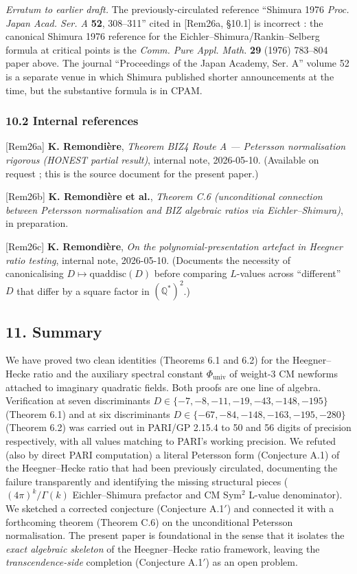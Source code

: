\documentclass[
  11pt,
  a4paper,
]{amsart}
\begin{document}
\emph{Erratum to earlier draft.} The previously-circulated reference ``Shimura 1976 \emph{Proc. Japan Acad. Ser. A} \textbf{52}, 308--311'' cited in {[}Rem26a, §10.1{]} is incorrect : the canonical Shimura 1976 reference for the Eichler--Shimura/Rankin--Selberg formula at critical points is the \emph{Comm. Pure Appl. Math.} \textbf{29} (1976) 783--804 paper above. The journal ``Proceedings of the Japan Academy, Ser. A'' volume 52 is a separate venue in which Shimura published shorter announcements at the time, but the substantive formula is in CPAM.

\hypertarget{internal-references}{%
\subsubsection{10.2 Internal references}\label{internal-references}}

{[}Rem26a{]} \textbf{K. Remondière}, \emph{Theorem BIZ4 Route A --- Petersson normalisation rigorous (HONEST partial result)}, internal note, 2026-05-10. (Available on request ; this is the source document for the present paper.)

{[}Rem26b{]} \textbf{K. Remondière et al.}, \emph{Theorem C.6 (unconditional connection between Petersson normalisation and BIZ algebraic ratios via Eichler--Shimura)}, in preparation.

{[}Rem26c{]} \textbf{K. Remondière}, \emph{On the polynomial-presentation artefact in Heegner ratio testing}, internal note, 2026-05-10. (Documents the necessity of canonicalising \(D \mapsto \mathrm{quaddisc}(D)\) before comparing \(L\)-values across ``different'' \(D\) that differ by a square factor in \((\mathbb{Q}^{\ast})^{2}\).)

\hypertarget{summary}{%
\subsection{11. Summary}\label{summary}}

We have proved two clean identities (Theorems 6.1 and 6.2) for the Heegner--Hecke ratio and the auxiliary spectral constant \(\Phi_{\mathrm{univ}}\) of weight-3 CM newforms attached to imaginary quadratic fields. Both proofs are one line of algebra. Verification at seven discriminants \(D\in\{-7,-8,-11,-19,-43,-148,-195\}\) (Theorem 6.1) and at six discriminants \(D\in\{-67,-84,-148,-163,-195,-280\}\) (Theorem 6.2) was carried out in PARI/GP 2.15.4 to 50 and 56 digits of precision respectively, with all values matching to PARI's working precision. We refuted (also by direct PARI computation) a literal Petersson form (Conjecture A.1) of the Heegner--Hecke ratio that had been previously circulated, documenting the failure transparently and identifying the missing structural pieces (\((4\pi)^{k}/\Gamma(k)\) Eichler--Shimura prefactor and CM Sym\(^{2}\) L-value denominator). We sketched a corrected conjecture (Conjecture A.1\('\)) and connected it with a forthcoming theorem (Theorem C.6) on the unconditional Petersson normalisation. The present paper is foundational in the sense that it isolates the \emph{exact algebraic skeleton} of the Heegner--Hecke ratio framework, leaving the \emph{transcendence-side} completion (Conjecture A.1\('\)) as an open problem.
\end{document}
